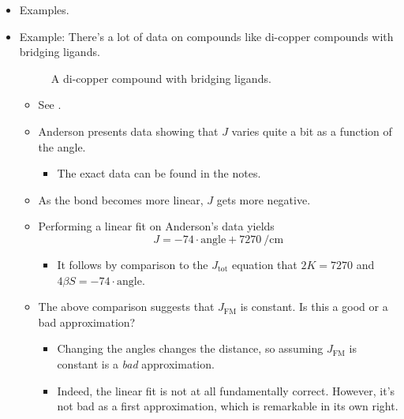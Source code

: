 \documentclass[../notes.tex]{subfiles}
\begin{document}
\begin{itemize}
\begin{itemize}
\begin{itemize}
        \end{itemize}
    \end{itemize}
    \item Examples.
    \item Example: There's a lot of data on compounds like di-copper compounds with bridging ligands.
    \begin{figure}[h!]
        \centering
        \footnotesize
        \caption{A di-copper compound with bridging ligands.}
        \label{fig:dicopperSpin}
    \end{figure}
    \begin{itemize}
        \item See \textcite{bib:KahnMolMagnet}.
        \item Anderson presents data showing that $J$ varies quite a bit as a function of the  angle.
        \begin{itemize}
            \item The exact data can be found in the notes.
        \end{itemize}
        \item As the bond becomes more linear, $J$ gets more negative.
        \item Performing a linear fit on Anderson's data yields
        \begin{equation*}
            J = -74\cdot\text{angle}+\SI{7270}{\per\centi\meter}
        \end{equation*}
        \begin{itemize}
            \item It follows by comparison to the $J_\text{tot}$ equation that $2K=7270$ and $4\beta S=-74\cdot\text{angle}$.
        \end{itemize}
        \item The above comparison suggests that $J_\text{FM}$ is constant. Is this a good or a bad approximation?
        \begin{itemize}
            \item Changing the angles changes the distance, so assuming $J_\text{FM}$ is constant is a \emph{bad} approximation.
            \item Indeed, the linear fit is not at all fundamentally correct. However, it's not bad as a first approximation, which is remarkable in its own right.

\end{itemize}
\end{itemize}
\end{itemize}
\end{document}
